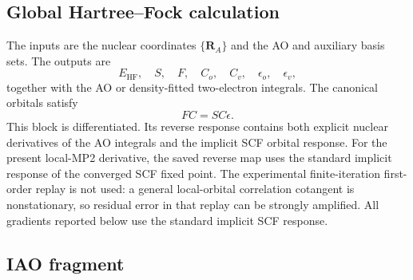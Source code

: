 \documentclass[11pt]{article}
\begin{document}
\subsection{Global Hartree--Fock calculation}

The inputs are the nuclear coordinates $\{\mathbf R_A\}$ and the AO and
auxiliary basis sets.  The outputs are
\begin{equation}
 E_{\mathrm{HF}},\quad S,\quad F,\quad C_o,\quad C_v,
 \quad \epsilon_o,\quad \epsilon_v,
 \label{eq:workflow-hf-output}
\end{equation}
together with the AO or density-fitted two-electron integrals.  The canonical
orbitals satisfy
\begin{equation}
 FC=SC\epsilon.
\end{equation}
This block is differentiated.  Its reverse response contains both explicit
nuclear derivatives of the AO integrals and the implicit SCF orbital response.
For the present local-MP2 derivative, the saved reverse map uses the standard
implicit response of the converged SCF fixed point.  The experimental
finite-iteration first-order replay is not used: a general local-orbital
correlation cotangent is nonstationary, so residual error in that replay can
be strongly amplified.  All gradients reported below use the standard
implicit SCF response.

\subsection{IAO fragment}
\end{document}
